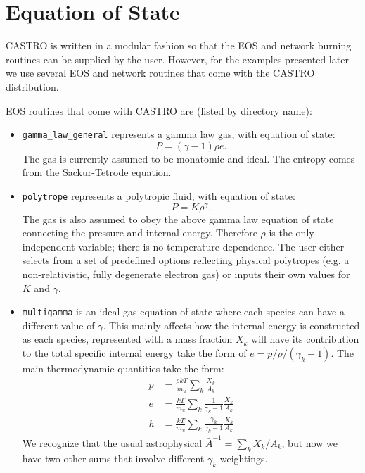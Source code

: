 \section{Equation of State}
CASTRO is written in a modular fashion so that the EOS and network
burning routines can be supplied by the user.   However, for the
examples presented later we use several EOS and network routines
that come with the CASTRO distribution.  

EOS routines that come with CASTRO are (listed by directory name):
\begin{itemize}

\item {\tt gamma\_law\_general} represents a gamma law gas, with equation of state:
\begin{equation}
  P = (\gamma - 1) \rho e.
\end{equation}
The gas is currently assumed to be monatomic and ideal. The entropy comes from the Sackur-Tetrode equation.

\item {\tt polytrope} represents a polytropic fluid, with equation of state:
\begin{equation}
  P = K \rho^\gamma.
\end{equation}
The gas is also assumed to obey the above gamma law equation of state connecting the pressure and internal energy. Therefore $\rho$ is the only independent variable; there is no temperature dependence. The user either selects from a set of predefined options reflecting physical polytropes (e.g. a non-relativistic, fully degenerate electron gas) or inputs their own values for $K$ and $\gamma$.

\item {\tt multigamma} is an ideal gas equation of state where each species can have
a different value of $\gamma$.  This mainly affects how the internal energy is constructed
as each species, represented with a mass fraction $X_k$ will have its contribution to the total
specific internal energy take the form of $e = p/\rho/(\gamma_k - 1)$.  
The main thermodynamic quantities take the form:
\begin{align}
p &= \frac{\rho k T}{m_u} \sum_k \frac{X_k}{A_k} \\
e &= \frac{k T}{m_u} \sum_k \frac{1}{\gamma_k - 1} \frac{X_k}{A_k} \\
h &= \frac{k T}{m_u} \sum_k \frac{\gamma_k}{\gamma_k - 1} \frac{X_k}{A_k}
\end{align}
We recognize that the usual astrophysical $\bar{A}^{-1} = \sum_k X_k/A_k$, but
now we have two other sums that involve different $\gamma_k$ weightings.


\end{itemize}
